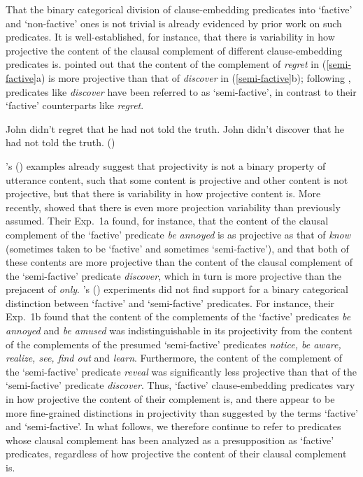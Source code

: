 \documentclass[11pt,fleqn]{article}
\newcommand{\6}{\mbox{$[\hspace*{-.6mm}[$}}
\newcommand{\9}{\mbox{$]\hspace*{-.6mm}]$}}
\newcommand{\citetpos}[1]{\citeauthor{#1}'s (\citeyear{#1})}
\begin{document}
That the binary categorical division of clause-embedding predicates into `factive' and `non-factive' ones is not trivial is already evidenced by prior work on such predicates. It is well-established, for instance, that there is variability in how projective the content of the clausal complement of different clause-embedding predicates is.  \citet{karttunen71b} pointed out that the content of the complement of {\em regret} in (\ref{semi-factive}a) is more projective than that of {\em discover} in (\ref{semi-factive}b); following \citealt{karttunen71b}, predicates like {\em discover} have been referred to as `semi-factive', in contrast to their `factive' counterparts like {\em regret}.


\begin{exe}
\ex\label{semi-factive}
\begin{xlist}
\ex John didn't regret that he had not told the truth.
\ex John didn't discover that he had not told the truth.  
\hfill (\citealt[63]{karttunen71b})

\end{xlist}
\end{exe}

\citetpos{karttunen71b} examples already suggest that projectivity is not a binary property of utterance content, such that some content is projective and other content is not projective, but that there is variability in how projective content is. More recently, \citet*{tbd-variability} showed that there is even more projection variability than previously assumed. Their Exp.~1a found, for instance, that the content of the clausal complement of the `factive' predicate {\em be annoyed} is as projective as that of {\em know} (sometimes taken to be `factive' and sometimes `semi-factive'), and that both of these contents are more projective than the content of the clausal complement of the `semi-factive' predicate {\em discover}, which in turn is more projective than the prejacent of {\em only}. \citetpos{tbd-variability} experiments did not find support for a binary categorical distinction between `factive' and `semi-factive' predicates. For instance, their Exp.~1b found that the content of the complements of the `factive' predicates {\em be annoyed} and {\em be amused} was indistinguishable in its projectivity from the content of the complements of the presumed `semi-factive' predicates {\em notice, be aware, realize, see, find out} and {\em learn}. Furthermore, the content of the complement of the `semi-factive' predicate {\em reveal} was significantly less projective than that of the `semi-factive' predicate {\em discover}. Thus, `factive' clause-embedding predicates vary in how projective the content of their complement is, and there appear to be more fine-grained distinctions in projectivity than suggested by the terms `factive' and `semi-factive'. In what follows, we therefore continue to refer to predicates whose clausal complement has been analyzed as a presupposition as `factive' predicates, regardless of how projective the content of their clausal complement is.
\end{document}
